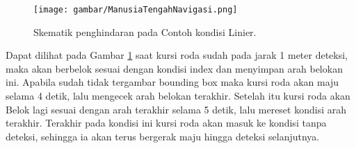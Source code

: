 \begin{figure}[H]
  \centering
  \texttt{[image: gambar/ManusiaTengahNavigasi.png]}
  \caption{Skematik penghindaran pada Contoh kondisi Linier.}
  \label{fig:Skematik Kondisi Linier}
\end{figure}

Dapat dilihat pada Gambar \ref{fig:Skematik Kondisi Linier} saat kursi roda sudah pada jarak 1 meter deteksi, maka akan berbelok sesuai dengan kondisi index dan menyimpan arah belokan ini. Apabila sudah tidak tergambar bounding box maka kursi roda akan maju selama 4 detik, lalu mengecek arah belokan terakhir. Setelah itu kursi roda akan Belok lagi sesuai dengan arah terakhir selama 5 detik, lalu mereset kondisi arah terakhir. Terakhir pada kondisi ini kursi roda akan masuk ke kondisi tanpa deteksi, sehingga ia akan terus bergerak maju hingga deteksi selanjutnya.


